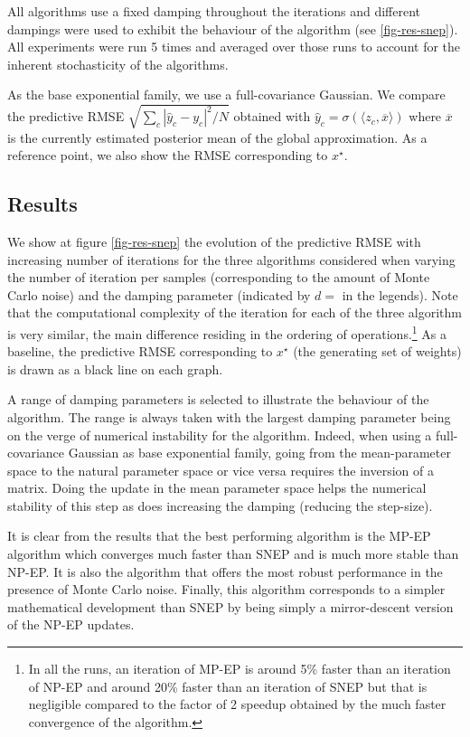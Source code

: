 All algorithms use a fixed damping throughout the iterations and different dampings were used to exhibit the behaviour of the algorithm (see \ref{fig-res-snep}). All experiments were run 5 times and averaged over those runs to account for the inherent stochasticity of the algorithms. 

As the base exponential family, we use a full-covariance Gaussian. We compare the predictive RMSE $\sqrt{\sum_c |\hat y_c-y_c|^2/N}$ obtained with $\hat y_c = \sigma(\langle z_c, \overline x\rangle)$ where $\overline x$ is the currently estimated posterior mean of the global approximation. As a reference point, we also show the RMSE corresponding to $x^\star$.

\subsection{Results}

We show at figure \ref{fig-res-snep} the evolution of the predictive RMSE with increasing number of iterations for the three algorithms considered when varying the number of iteration per samples (corresponding to the amount of Monte Carlo noise) and the damping parameter (indicated by $d=$ in the legends). Note that the computational complexity of the iteration for each of the three algorithm is very similar, the main difference residing in the ordering of operations.\footnote{In all the runs, an iteration of MP-EP is around 5\% faster than an iteration of NP-EP and around 20\% faster than an iteration of SNEP but that is negligible compared to the factor of 2 speedup obtained by the much faster convergence of the algorithm.} As a baseline, the predictive RMSE corresponding to $x^{\star}$ (the generating set of weights) is drawn as a black line on each graph.

A range of damping parameters is selected to illustrate the behaviour of the algorithm. The range is always taken with the largest damping parameter being on the verge of numerical instability for the algorithm. Indeed, when using a full-covariance Gaussian as base exponential family, going from the mean-parameter space to the natural parameter space or vice versa requires the inversion of a matrix. Doing the update in the mean parameter space helps the numerical stability of this step as does increasing the damping (reducing the step-size).

It is clear from the results that the best performing algorithm is the MP-EP algorithm which converges much faster than SNEP and is much more stable than NP-EP. It is also the algorithm that offers the most robust performance in the presence of Monte Carlo noise. Finally, this algorithm corresponds to a simpler mathematical development than SNEP by being simply a mirror-descent version of the NP-EP updates. 

